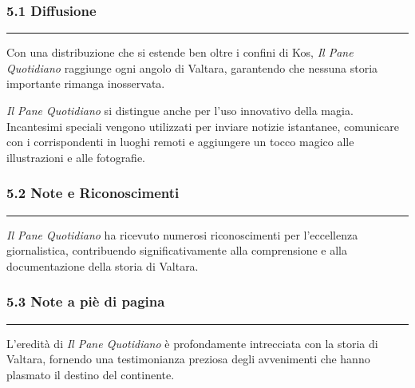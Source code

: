 \subsubsection{\texorpdfstring{5.1
\textbf{Diffusione}}{5.1 Diffusione}}\label{diffusione}

\begin{center}\rule{0.5\linewidth}{0.5pt}\end{center}

Con una distribuzione che si estende ben oltre i confini di Kos,
\emph{Il Pane Quotidiano} raggiunge ogni angolo di Valtara, garantendo
che nessuna storia importante rimanga inosservata.

\emph{Il Pane Quotidiano} si distingue anche per l'uso innovativo della
magia. Incantesimi speciali vengono utilizzati per inviare notizie
istantanee, comunicare con i corrispondenti in luoghi remoti e
aggiungere un tocco magico alle illustrazioni e alle fotografie.

\subsubsection{\texorpdfstring{5.2 \textbf{Note e
Riconoscimenti}}{5.2 Note e Riconoscimenti}}\label{note-e-riconoscimenti}

\begin{center}\rule{0.5\linewidth}{0.5pt}\end{center}

\emph{Il Pane Quotidiano} ha ricevuto numerosi riconoscimenti per
l'eccellenza giornalistica, contribuendo significativamente alla
comprensione e alla documentazione della storia di Valtara.

\subsubsection{\texorpdfstring{5.3 \textbf{Note a piè di
pagina}}{5.3 Note a piè di pagina}}\label{note-a-piuxe8-di-pagina}

\begin{center}\rule{0.5\linewidth}{0.5pt}\end{center}

L'eredità di \emph{Il Pane Quotidiano} è profondamente intrecciata con
la storia di Valtara, fornendo una testimonianza preziosa degli
avvenimenti che hanno plasmato il destino del continente.
